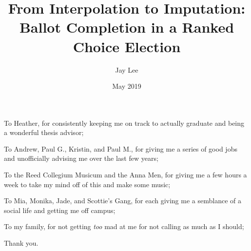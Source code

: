 \documentclass[12pt,twoside]{reedthesis}
\title{From Interpolation to Imputation: Ballot Completion in a Ranked Choice Election}
\author{Jay Lee}
\date{May 2019}
\begin{document}
  \maketitle

\frontmatter %
\pagestyle{empty} %
  \begin{acknowledgements}
    To Heather, for consistently keeping me on track to actually graduate and being a wonderful thesis advisor;
    
    \par
     \bigskip
    
    \noindent To Andrew, Paul G., Kristin, and Paul M., for giving me a series of good jobs and unofficially advising me over the last few years;
    
    \par
     \bigskip
    
    \noindent To the Reed Collegium Musicum and the Anna Men, for giving me a few hours a week to take my mind off of this and make some music;
    
    \par
     \bigskip
    
    \noindent To Mia, Monika, Jade, and Scottie's Gang, for each giving me a semblance of a social life and getting me off campus;
    
    \par
     \bigskip
    
    \noindent To my family, for not getting \emph{too} mad at me for not calling as much as I should;
    
    \par
     \bigskip
    
    \noindent Thank you.
  \end{acknowledgements}
\end{document}
